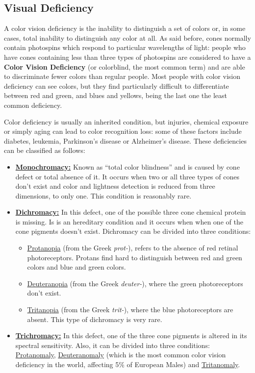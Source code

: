 \documentclass{report}
\begin{document}
\subsection{Visual Deficiency}
A color vision deficiency is the inability to distinguish a set of colors or, in some cases, total
inability to distinguish any color at all. As said before, cones normally contain photospins which respond
to particular wavelengths of light: people who have cones containing less than three types of photospins are considered to have a \textbf{Color Vision Deficiency} (or colorblind, the most common term)
and are able to discriminate fewer colors than regular people. Most people with color vision deficiency can
see colors, but they find particularly difficult to differentiate between red and green, and blues and
yellows, being the last one the least common deficiency. \par
Color deficiency is usually an inherited condition, but injuries, chemical exposure or simply aging can lead to color
recognition loss: some of these factors include diabetes, leukemia, Parkinson’s disease or Alzheimer’s
disease. These deficiencies can be classified as follows:
%
\begin{itemize}
\item \textbf{\underline{Monochromacy:}} Known as “total color blindness” and is caused by cone defect or
total absence of it. It occurs when two or all three types of cones don’t exist and color and lightness
detection is reduced from three dimensions, to only one. This condition is reasonably rare.
\item \textbf{\underline{Dichromacy:}} In this defect, one of the possible three cone chemical protein is
missing. Is is an hereditary condition and it occurs when when one of the cone pigments doesn’t exist.
Dichromacy can be divided into three conditions:
	\begin{itemize}
	\item \underline{Protanopia} (from the Greek \emph{prot-}), refers to the absence of red retinal
    photoreceptors.
    Protans find hard to distinguish between red and green colors and blue and green colors.
    \item \underline{Deuteranopia} (from the Greek \emph{deuter-}), where the green photoreceptors don’t
    exist.
    \item \underline{Tritanopia} (from the Greek \emph{trit-}), where the blue photoreceptors are absent.
    This type of dichromacy is very rare.
	\end{itemize}
\item \textbf{\underline{Trichromacy:}} In this defect, one of the three cone pigments is altered in its
spectral sensitivity. Also, it can be divided into three conditions: \underline{Protanomaly}, \underline{Deuteranomaly} (which is the most common color vision deficiency in the world, affecting 5\% of European Males) and \underline{Tritanomaly}.
\end{itemize} \par
\end{document}

